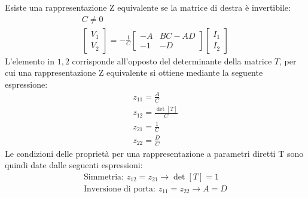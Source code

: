 \documentclass{article}
\numberwithin{equation}{subsection}
\begin{document}
Esiste una rappresentazione Z equivalente se la matrice di destra è invertibile:
\begin{gather*}
    C\neq0\\
    \displaystyle\begin{bmatrix}
        V_1\\V_2
    \end{bmatrix}=-\frac{1}{C}\begin{bmatrix}
        -A&BC-AD\\-1&-D
    \end{bmatrix}\begin{bmatrix}
        I_1\\I_2
    \end{bmatrix}
\end{gather*}
L'elemento in $1,2$ corrisponde all'opposto del determinante della matrice $T$, per cui una rappresentazione Z equivalente si ottiene mediante la seguente espressione:
\begin{gather*}
    z_{11}=\displaystyle\frac{A}{C}\\
    z_{12}=\displaystyle\frac{\det[T]}{C}\\
    z_{21}=\displaystyle\frac{1}{C}\\
    z_{22}=\displaystyle\frac{D}{C}
\end{gather*}
Le condizioni delle proprietà per una rappresentazione a parametri diretti T sono quindi date dalle seguenti espressioni:
\begin{gather}\label{eq:condizioni-parametri-diretti}
    \mbox{Simmetria: }z_{12}=z_{21}\to \det[T]=1\\
    \mbox{Inversione di porta: }z_{11}=z_{22}\to A=D
\end{gather}
\end{document}
